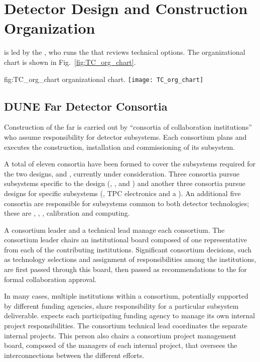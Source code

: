 \chapter{Detector Design and Construction Organization}
\label{vl:tc-overview}

 is led by the , who runs the  that
reviews  technical options. The  organizational
chart is shown in Fig.~\ref{fig:TC_org_chart}.
\begin{dunefigure}{fig:TC_org_chart}
  {  organizational chart.}
  \texttt{[image: TC\_org\_chart]}
\end{dunefigure}


\section{DUNE Far Detector Consortia}
\label{sec:consortia}

Construction of the  far  is carried out by
``consortia of collaboration institutions'' who assume responsibility
for detector subsystems.  Each consortium plans and
executes the construction, installation and commissioning of its 
subsystem.

A total of eleven  consortia have been formed to cover the
subsystems required for the two  designs,  and
, currently under consideration.  Three consortia pursue
subsystems specific to the  design (, ,
and ) and another three consortia pursue designs for
 specific subsystems (, TPC electronics and a
 ).  An additional five consortia are responsible
for subsystems common to both detector technologies; these are
, , , calibration and computing.

A consortium leader and a technical lead manage each consortium.  The
consortium leader chairs an institutional board composed of one
representative from each of the contributing institutions.
Significant consortium decisions, such as technology selections and
assignment of responsibilities among the institutions, are first
passed through this board, then passed as recommendations to the
  for formal collaboration approval.

In many cases, multiple institutions within a consortium, potentially
supported by different funding agencies, share responsibility for a
particular subsystem deliverable.   expects each
participating funding agency to manage its own internal project
responsibilities.  The consortium technical lead coordinates the
separate internal projects. This person also chairs a consortium
project management board, composed of the managers of each internal
project, that oversees the interconnections between the different
efforts.

